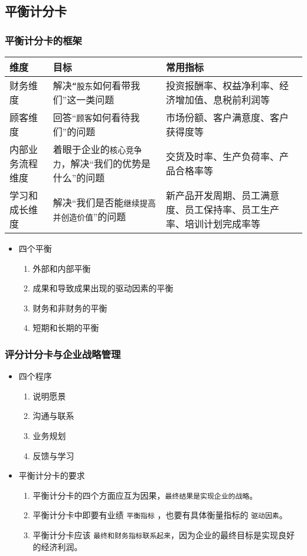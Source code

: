 \documentclass[11pt]{article}
\begin{document}
\subsection{平衡计分卡}
\label{sec:org32b24e5}
\subsubsection{平衡计分卡的框架}
\label{sec:orgcf59f0f}
\begin{center}
\begin{tabular}{lll}
维度 & 目标 & 常用指标\\
\hline
财务维度 & 解决\texttt{“股东}如何看带我们”这一类问题 & 投资报酬率、权益净利率、经济增加值、息税前利润等\\
顾客维度 & 回答“\texttt{顾客}如何看待我们”的问题 & 市场份额、客户满意度、客户获得度等\\
内部业务流程维度 & 着眼于企业的\texttt{核心竞争力}，解决“我们的优势是什么”的问题 & 交货及时率、生产负荷率、产品合格率等\\
学习和成长维度 & 解决“我们是否能\texttt{继续提高并创造价值}”的问题 & 新产品开发周期、员工满意度、员工保持率、员工生产率、培训计划完成率等\\
\end{tabular}
\end{center}

\begin{itemize}
\item 四个平衡
\begin{enumerate}
\item 外部和内部平衡
\item 成果和导致成果出现的驱动因素的平衡
\item 财务和非财务的平衡
\item 短期和长期的平衡
\end{enumerate}
\end{itemize}
\subsubsection{评分计分卡与企业战略管理}
\label{sec:org426ffcd}
\begin{itemize}
\item 四个程序
\begin{enumerate}
\item 说明愿景
\item 沟通与联系
\item 业务规划
\item 反馈与学习
\end{enumerate}
\item 平衡计分卡的要求
\begin{enumerate}
\item 平衡计分卡的四个方面应互为因果，\texttt{最终结果是实现企业的战略}。
\item 平衡计分卡中即要有业绩 \texttt{平衡指标} ，也要有具体衡量指标的 \texttt{驱动因素}。
\item 平衡计分卡应该 \texttt{最终和财务指标联系起来}，因为企业的最终目标是实现良好的经济利润。
\end{enumerate}
\end{itemize}
\end{document}
